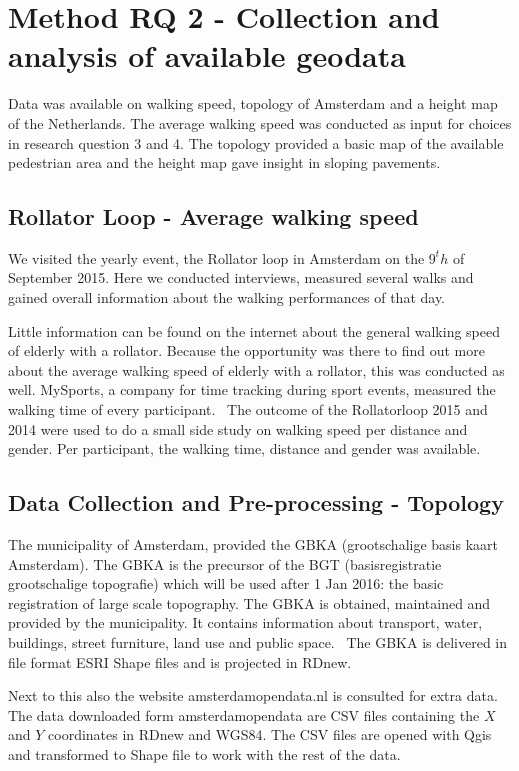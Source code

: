 \section{Method RQ 2 - Collection and analysis of available geodata}\label{rq2a}
Data was available on walking speed, topology of Amsterdam and a height map of the Netherlands. The average walking speed was conducted as input for choices in research question 3 and 4. The topology provided a basic map of the available pedestrian area and the height map gave insight in sloping pavements. 

\subsection{Rollator Loop - Average walking speed}
We visited the yearly event, the Rollator loop in Amsterdam on the $9^th$ of September 2015. Here we conducted interviews, measured several walks and gained overall information about the walking performances of that day. 

Little information can be found on the internet about the general walking speed of elderly with a rollator. Because the opportunity was there to find out more about the average walking speed of elderly with a rollator, this was conducted as well. MySports, a company for time tracking during sport events, measured the walking time of every participant.~\cite{mysports} The outcome of the Rollatorloop 2015 and 2014 were used to do a small side study on walking speed per distance and gender. Per participant, the walking time, distance and gender was available.

\subsection{Data Collection and Pre-processing - Topology }
The municipality of Amsterdam, provided the GBKA (grootschalige basis kaart Amsterdam). The GBKA is the precursor of the BGT (basisregistratie grootschalige topografie) which will be used after 1 Jan 2016: the basic registration of large scale topography. The GBKA is obtained, maintained and provided by the municipality. It contains information about transport, water, buildings, street furniture, land use and public space.~\cite{gbka} The GBKA is delivered in file format ESRI Shape files and is projected in RDnew. 

Next to this also the website amsterdamopendata.nl is consulted for extra data.~\cite{opendata} The data downloaded form amsterdamopendata are CSV files containing the $X$ and $Y$ coordinates in RDnew and WGS84. The CSV files are opened with Qgis and transformed to Shape file to work with the rest of the data. 

